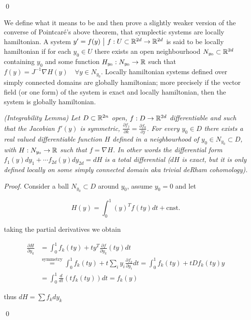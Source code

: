 \documentclass[12pt]{article}
\begin{document}
\qed

We define what it means to be  and then prove a slightly weaker version of the converse of Pointcar\'e's above theorem, that symplectic systems are locally hamiltonian. A system $y' = f(y) \,\,\big|\,\, f : U\subset\mathbb{R}^{2d} \to \mathbb{R}^{2d}$ is said to be locally hamiltonian if for each $y_0\in U$ there exists an open neighbourhood $N_{y_0}\subset \mathbb{R}^{2d}$ containing $y_0$ and some function $H_{y_0} : N_{y_0}\to \mathbb{R}$ such that $f(y) = J^{-1}\nabla H(y)\quad\forall y\in N_{y_0}$. Locally hamiltonian systems defined over simply connected domains are globally hamiltonian; more precisely if the vector field (or one form) of the system is exact and locally hamiltonian, then the  system is globally hamiltonian. 

 \textit{(Integrability Lemma) \cite{Numerical} Let $D\subset \mathbb{R}^{2n}$ open, $f: D\to \mathbb{R}^{2d}$ differentiable and such that the Jacobian $f'(y)$ is symmetric, $\frac{\partial f_j}{\partial k} = \frac{\partial f_k}{\partial j}$. For every $y_0\in D$ there exists a real valued differentiable function $H$ defined in a neighbourhood of $y_0\in N_{y_0}\subset D$, with $H:N_{y_0}\to\mathbb{R}$ such that $f = \nabla H$. In other words the differential form $f_1(y)dy_1 + \cdots f_{2d}(y)dy_{2d} = dH$ is a total differential ($dH$ is exact, but it is only defined locally on some simply connected domain aka trivial deRham cohomology).} 

\textit{Proof.} Consider a ball $N_{y_0}\subset D$ around $y_0$, assume $y_0=0$ and let 

$$
H(y) = \int_0^1 (y)^Tf(ty) dt + \text{cnst.}
$$

taking the partial derivatives we obtain

\begin{equation}\label{eq:hamiltonian differential}
\begin{split}
    \frac{\partial H}{\partial y_k} & = \int_0^1 f_k(ty) + t y^T\frac{\partial f}{\partial y_k}(ty) dt \\
    & \stackrel{\text{symmetry}}{=} \int_0^1 f_k(ty) + t\sum_i y_i\frac{\partial f_k}{\partial y_i} dt = \int_0^1 f_k(ty) + t D f_k(ty) y\\
    & = \int_0^1 \frac{d}{dt}\left( t f_k(ty) \right) dt = f_k(y)
\end{split}
\end{equation}

thus $dH = \sum f_k dy_k$

\qed
\end{document}
